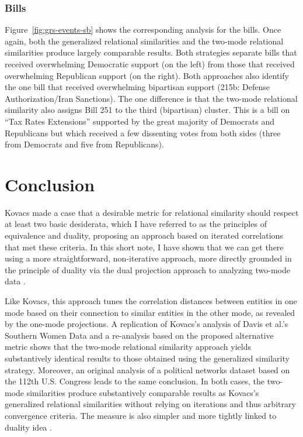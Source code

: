 \documentclass[a4paper,fleqn]{cas-sc}
\begin{document}
\subsubsection{Bills}
Figure~\ref{fig:grs-events-sb} shows the corresponding analysis for the bills. Once again, both the generalized relational similarities and the two-mode relational similarities produce largely comparable results. Both strategies separate bills that received overwhelming Democratic support (on the left) from those that received overwhelming Republican support (on the right). Both approaches also identify the one bill that received overwhelming bipartisan support (215b: Defense Authorization/Iran Sanctions). The one difference is that the two-mode relational similarity also assigns Bill 251 to the third (bipartisan) cluster. This is a bill on ``Tax Rates Extensions'' supported by the great majority of Democrats and Republicans but which received a few dissenting votes from both sides (three from Democrats and five from Republicans). 

\section{Conclusion}
Kovacs \citeyearpar{kovacs2010} made a case that a desirable metric for relational similarity should respect at least two basic desiderata, which I have referred to as the principles of equivalence and duality, proposing an approach based on iterated correlations that met these criteria. In this short note, I have shown that we can get there using a more straightforward, non-iterative approach, more directly grounded in the principle of duality via the dual projection approach to analyzing two-mode data \citep{everett2013}. 

Like Kovacs, this approach tunes the correlation distances between entities in one mode based on their connection to similar entities in the other mode, as revealed by the one-mode projections. A replication of Kovacs's analysis of Davis et al.'s \citeyearpar{davis1941} Southern Women Data and a re-analysis based on the proposed alternative metric shows that the two-mode relational similarity approach yields substantively identical results to those obtained using the generalized similarity strategy. Moreover, an original analysis of a political networks dataset based on the 112th U.S. Congress \citep{knoke2021multimodal} leads to the same conclusion. In both cases, the two-mode similarities produce substantively comparable results as Kovacs's generalized relational similarities without relying on iterations and thus arbitrary convergence criteria. The measure is also simpler and more tightly linked to duality idea \citep{breiger1974}. 
\end{document}
